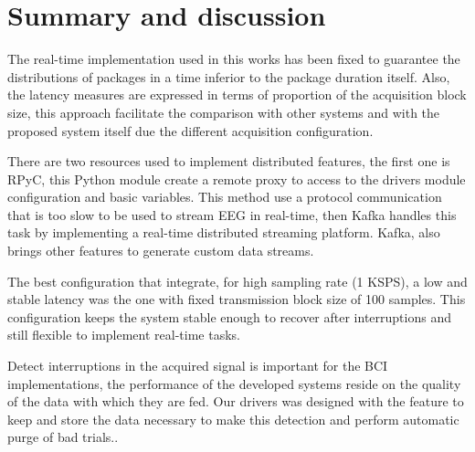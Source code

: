 

\section{Summary and discussion}

The real-time implementation used in this works has been fixed to guarantee the distributions of packages in a time inferior to the package duration itself. Also, the latency measures are expressed in terms of proportion of the acquisition block size, this approach facilitate the comparison with other systems and with the proposed system itself due the different acquisition configuration.

There are two resources used to implement distributed features, the first one is \gls*{RPyC}, this Python module create a remote proxy to access to the drivers module configuration and basic variables. This method use a protocol communication that is too slow to be used to stream EEG in real-time, then Kafka handles this task by implementing a real-time distributed streaming platform. Kafka, also brings other features to generate custom data streams.

The best configuration that integrate, for high sampling rate (1 KSPS), a low and stable latency was the one with fixed transmission block size of 100 samples. This configuration keeps the system stable enough to recover after interruptions and still flexible to implement real-time tasks.

Detect interruptions in the acquired signal is important for the BCI implementations, the performance of the developed systems reside on the quality of the data with which they are fed. Our drivers was designed with the feature to keep and store the data necessary to make this detection and perform automatic purge of bad trials.. 
